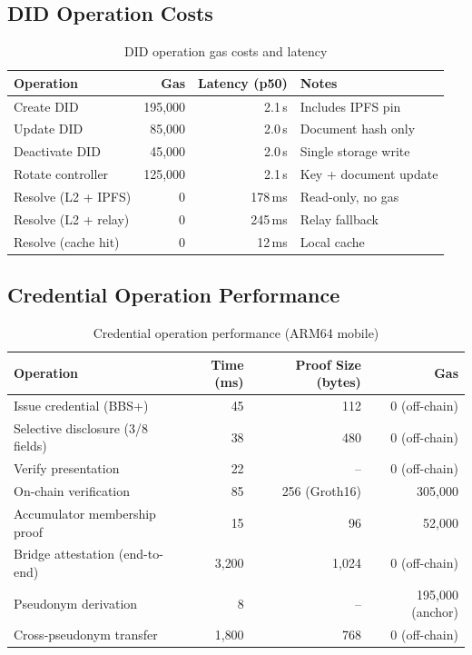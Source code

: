 \documentclass[11pt,a4paper]{article}
\begin{document}
\subsection{DID Operation Costs}

\begin{table}[h]
\centering
\caption{DID operation gas costs and latency}
\label{tab:did-costs}
\begin{tabular}{lrrl}
\toprule
\textbf{Operation} & \textbf{Gas} & \textbf{Latency (p50)} & \textbf{Notes} \\
\midrule
Create DID & 195{,}000 & 2.1\,s & Includes IPFS pin \\
Update DID & 85{,}000 & 2.0\,s & Document hash only \\
Deactivate DID & 45{,}000 & 2.0\,s & Single storage write \\
Rotate controller & 125{,}000 & 2.1\,s & Key + document update \\
Resolve (L2 + IPFS) & 0 & 178\,ms & Read-only, no gas \\
Resolve (L2 + relay) & 0 & 245\,ms & Relay fallback \\
Resolve (cache hit) & 0 & 12\,ms & Local cache \\
\bottomrule
\end{tabular}
\end{table}

\subsection{Credential Operation Performance}

\begin{table}[h]
\centering
\caption{Credential operation performance (ARM64 mobile)}
\label{tab:credential-perf}
\begin{tabular}{lrrr}
\toprule
\textbf{Operation} & \textbf{Time (ms)} & \textbf{Proof Size (bytes)} & \textbf{Gas} \\
\midrule
Issue credential (BBS+) & 45 & 112 & 0 (off-chain) \\
Selective disclosure (3/8 fields) & 38 & 480 & 0 (off-chain) \\
Verify presentation & 22 & -- & 0 (off-chain) \\
On-chain verification & 85 & 256 (Groth16) & 305{,}000 \\
Accumulator membership proof & 15 & 96 & 52{,}000 \\
Bridge attestation (end-to-end) & 3{,}200 & 1{,}024 & 0 (off-chain) \\
Pseudonym derivation & 8 & -- & 195{,}000 (anchor) \\
Cross-pseudonym transfer & 1{,}800 & 768 & 0 (off-chain) \\
\bottomrule
\end{tabular}
\end{table}
\end{document}
